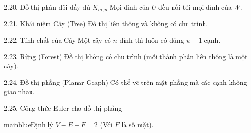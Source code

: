 \documentclass[10pt, xcolor={dvipsnames}]{beamer}
\begin{document}
\begin{frame}{2.20. Đồ thị phân đôi đầy đủ $K_{m,n}$}
    Mọi đỉnh của $U$ đều nối tới mọi đỉnh của $W$.
\end{frame}

\begin{frame}{2.21. Khái niệm Cây (Tree)}
    Đồ thị liên thông và không có chu trình.
\end{frame}

\begin{frame}{2.22. Tính chất của Cây}
    Một cây có $n$ đỉnh thì luôn có đúng $n-1$ cạnh.
\end{frame}

\begin{frame}{2.23. Rừng (Forest)}
    Đồ thị không có chu trình (mỗi thành phần liên thông là một cây).
\end{frame}

\begin{frame}{2.24. Đồ thị phẳng (Planar Graph)}
    Có thể vẽ trên mặt phẳng mà các cạnh không giao nhau.
\end{frame}

\begin{frame}{2.25. Công thức Euler cho đồ thị phẳng}
    \begin{detailbox}{mainblue}{Định lý}
        $V - E + F = 2$ (Với $F$ là số mặt).
    \end{detailbox}
\end{frame}
\end{document}
